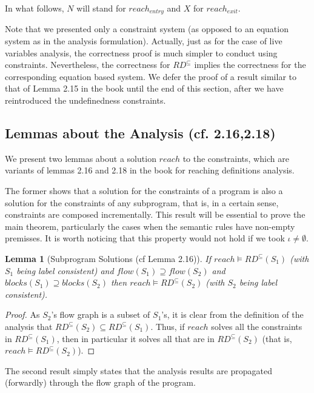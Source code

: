 \documentclass[a4wide,12pt]{article}
\theoremstyle{definition}
\theoremstyle{plain}
\newtheorem{lemma}[theo]{Lemma}
\theoremstyle{remark}
\begin{document}
In what follows, $N$ will stand for $reach_{entry}$ and $X$ for $reach_{exit}$. 


Note that we presented only a constraint system (as opposed to an equation system 
as in the analysis formulation). Actually, just as for the case of live variables analysis,
the correctness proof is much simpler to conduct using constraints.
Nevertheless, the correctness for $RD^\subseteq$ implies the correctness for the corresponding
equation based system. We defer the proof of a result similar to that of Lemma 2.15 in the book
until the end of this section, after we have reintroduced the undefinedness constraints.


\subsection*{Lemmas about the Analysis (cf. 2.16,2.18)}

We present two lemmas about a solution $reach$ to the constraints, which are variants
of lemmas 2.16 and 2.18 in the book for reaching definitions analysis.

The former 
shows that a solution for the constraints of a program is also a solution for the constraints of any
subprogram, that is, in a certain sense, constraints are composed incrementally.
This result will be essential to prove the main theorem, particularly the cases when
the semantic rules have non-empty premisses. 
It is worth noticing that this property would not hold if we took $\iota \neq \emptyset$.

\begin{lemma}[Subprogram Solutions (cf Lemma 2.16)]
\label{lemmasubp}
If $reach \models RD^\subseteq(S_1)$ (with $S_1$ being label consistent) and
$flow(S_1) \supseteq flow(S_2)$ and $blocks(S_1) \supseteq blocks(S_2)$ then
$reach \models RD^\subseteq(S_2)$ (with $S_2$ being label consistent).
\end{lemma}
\begin{proof}
As $S_2$'s flow graph is a subset of $S_1$'s, it is clear from the definition
of the analysis 
that $RD^{\subseteq}(S_2) \subseteq RD^{\subseteq}(S_1)$. Thus, if 
$reach$ solves all the constraints in $RD^\subseteq(S_1)$, then in particular it
solves all that are in $RD^\subseteq(S_2)$ (that is, $reach \models RD^\subseteq(S_2)$).
\end{proof}


The second result simply states that the analysis results are
propagated (forwardly) through the flow graph of the program.
\end{document}
